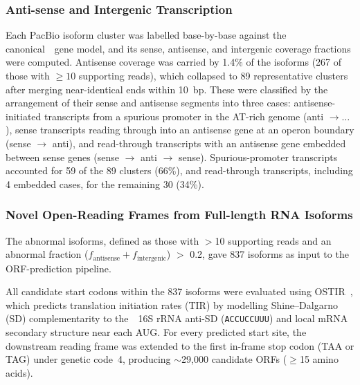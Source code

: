 \subsubsection{Anti-sense and Intergenic Transcription}

Each PacBio isoform cluster was labelled base-by-base against the canonical~\syn~gene model, and its sense, antisense, and intergenic coverage fractions were computed.
Antisense coverage was carried by 1.4\% of the isoforms (267 of those with $\geq 10$ supporting reads), which collapsed to 89 representative clusters after merging near-identical ends within 10~bp.
These were classified by the arrangement of their sense and antisense segments into three cases: antisense-initiated transcripts from a spurious promoter in the AT-rich genome (anti $\rightarrow \ldots$), sense transcripts reading through into an antisense gene at an operon boundary (sense $\rightarrow$ anti), and read-through transcripts with an antisense gene embedded between sense genes (sense $\rightarrow$ anti $\rightarrow$ sense).
Spurious-promoter transcripts accounted for 59 of the 89 clusters (66\%), and read-through transcripts, including 4 embedded cases, for the remaining 30 (34\%).

\subsubsection{Novel Open-Reading Frames from Full-length RNA Isoforms}

The abnormal isoforms, defined as those with $>$10 supporting reads and an abnormal fraction ($f_\mathrm{antisense} + f_\mathrm{intergenic}$) $>$ 0.2, gave 837 isoforms as input to the ORF-prediction pipeline.

All candidate start codons within the 837 isoforms were evaluated using OSTIR~\cite{roots_ostir_2021}, which predicts translation initiation rates (TIR) by modelling Shine--Dalgarno (SD) complementarity to the~\syn~16S rRNA anti-SD (\texttt{ACCUCCUUU}) and local mRNA secondary structure near each AUG.
For every predicted start site, the downstream reading frame was extended to the first in-frame stop codon (TAA or TAG) under genetic code~4, producing ${\sim}$29{,}000 candidate ORFs ($\geq$15 amino acids).


